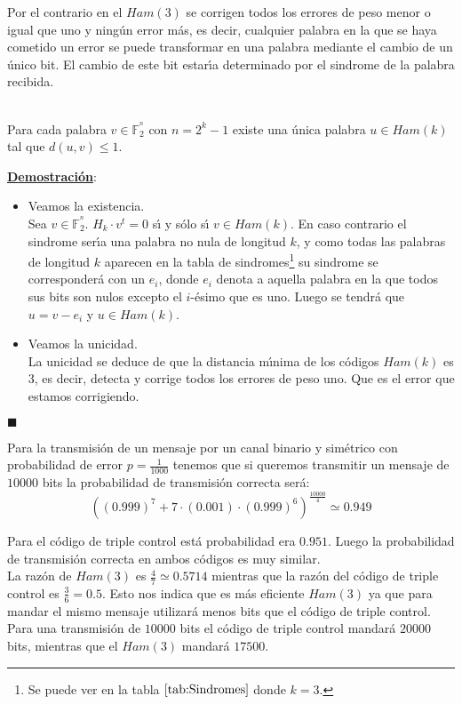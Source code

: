 Por el contrario en el $Ham(3)$ se corrigen todos los errores de peso menor o
igual que uno y ning\'un error m\'as, es decir, cualquier palabra en la que
se haya cometido un error se puede transformar en una palabra mediante el
cambio de un \'unico bit. El cambio de este bit estar\'{\i}a determinado por
el sindrome de la palabra recibida.
%
\newpage
%
\begin{proposicion}
\ \\
Para cada palabra $v\in \mathbb{F}^{^n}_2$ con $n=2^k-1$ existe una \'unica
palabra $u\in Ham(k)$ tal que $d(u,v)\leq 1$.
\end{proposicion}
\underline{\textbf{Demostraci\'on}}:\\
\begin{itemize}
\item Veamos la existencia.\\

Sea $v\in \mathbb{F}^{^n}_2$. $H_k\cdot v^t=0$ s\'{\i} y s\'olo s\'{\i}
$v\in Ham(k)$. En caso contrario el sindrome ser\'{\i}a una palabra no nula
de longitud $k$, y como todas las palabras de longitud $k$ aparecen en la
tabla de sindromes\footnote{Se puede ver en la tabla $\ref{tab:Sindromes}$
donde $k=3$.} su sindrome se corresponder\'a con un $e_i$, donde $e_i$ denota
a aquella palabra en la que todos sus bits son nulos excepto el $i$-\'esimo
que es uno. Luego se tendr\'a que $u=v-e_i$ y $u\in Ham(k)$.
\item Veamos la unicidad.\\

La unicidad se deduce de que la distancia m\'{\i}nima de los c\'odigos $Ham(k)$
es $3$, es decir, detecta y corrige todos los errores de peso uno. Que es el
error que estamos corrigiendo.
\end{itemize}
\begin{flushright}
$\blacksquare$
\end{flushright}

Para la transmisi\'on de un mensaje por un canal binario y sim\'etrico con 
probabilidad de error $p=\frac{1}{1000}$ tenemos que si queremos transmitir un
mensaje de $10000$ bits la probabilidad de transmisi\'on correcta ser\'a:
\begin{displaymath}
((0.999)^7+7\cdot(0.001)\cdot(0.999)^6)^{\frac{10000}{4}}\simeq 0.949
\end{displaymath}

Para el c\'odigo de triple control est\'a probabilidad era $0.951$. Luego la
probabilidad de transmisi\'on correcta en ambos c\'odigos es muy similar.\\

La raz\'on de $Ham(3)$ es $\frac{4}{7}\simeq 0.5714$ mientras que la raz\'on
del c\'odigo de triple control es $\frac{3}{6} = 0.5$. Esto nos indica que es
m\'as eficiente $Ham(3)$ ya que para mandar el mismo mensaje utilizar\'a menos
bits que el c\'odigo de triple control.\\

Para una transmisi\'on de $10000$ bits el c\'odigo de triple control mandar\'a
$20000$ bits, mientras que el $Ham(3)$ mandar\'a $17500$.
